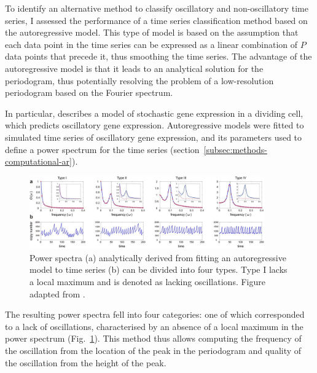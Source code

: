 To identify an alternative method to classify oscillatory and non-oscillatory time series, I assessed the performance of a time series classification method based on the autoregressive model.
This type of model is based on the assumption that each data point in the time series can be expressed as a linear combination of $P$ data points that precede it, thus smoothing the time series.
The advantage of the autoregressive model is that it leads to an analytical solution for the periodogram, thus potentially resolving the problem of a low-resolution periodogram based on the Fourier spectrum.

In particular, \textcite{jiaFrequencyDomainAnalysis2021} describes a model of stochastic gene expression in a dividing cell, which predicts oscillatory gene expression.
Autoregressive models were fitted to simulated time series of oscillatory gene expression, and its parameters used to define a power spectrum for the time series (section~\ref{subsec:methods-computational-ar}).


\begin{figure}
  \centering
  \includegraphics[width=0.9\textwidth]{jiaFrequencyDomainAnalysis2020_2ab_adapted}
  \caption[
    Power spectra analytically derived from fitting an autoregressive model to time series can be divided into four types
  ]{
    Power spectra (a) analytically derived from fitting an autoregressive model to time series (b) can be divided into four types.
    Type I lacks a local maximum and is denoted as lacking oscillations.
    Figure adapted from \textcite{jiaFrequencyDomainAnalysis2020}.
  }
  \label{fig:analysis-ar-classification}
\end{figure}

The resulting power spectra fell into four categories: one of which corresponded to a lack of oscillations, characterised by an absence of a local maximum in the power spectrum (Fig.\ \ref{fig:analysis-ar-classification}).
This method thus allows computing the frequency of the oscillation from the location of the peak in the periodogram and quality of the oscillation from the height of the peak.

